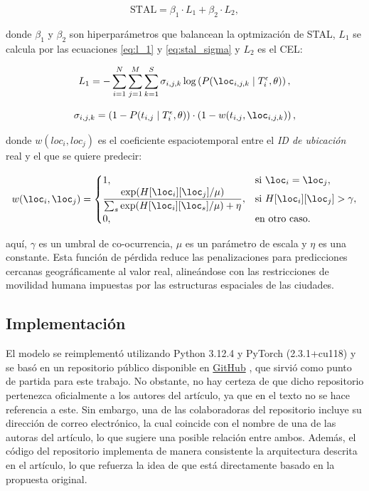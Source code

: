 \begin{equation}
\text{STAL} = \beta_1 \cdot L_1 + \beta_2 \cdot L_2,
\label{eq:stal}
\end{equation}

\noindent
donde $ \beta_1$ y $ \beta_2$ son hiperparámetros que balancean la optmización de STAL, \(L_1\) se calcula por las ecuaciones \ref{eq:l_1}  y \ref{eq:stal_sigma} y \(L_2\) es el CEL:

\begin{equation}
    L_1 = - \sum_{i=1}^N \sum_{j=1}^M \sum_{k=1}^S \sigma_{i,j,k} \log \left( P(\loc_{i,j,k} \mid T^\epsilon_i, \theta) \right),
\label{eq:l_1}
\end{equation}

\begin{equation}
    \sigma_{i,j,k} = \left( 1 - P(t_{i,j} \mid T^\epsilon_i, \theta) \right) \cdot \left( 1 - w(t_{i,j}, \loc_{i,j,k}) \right),
\label{eq:stal_sigma}
\end{equation}

\noindent
donde \(w(loc_i, loc_j)\) es el coeficiente espaciotemporal entre el \textit{ID de ubicación} real y el que se quiere predecir:

\begin{equation}
    w(\loc_i, \loc_j) =
    \begin{cases} 
        1, & \text{si } \loc_i = \loc_j, \\
        \displaystyle \frac{\exp(H[\loc_i][\loc_j] / \mu)}{\sum_s \exp(H[\loc_i][\loc_s] / \mu) + \eta}, & \text{si } H[\loc_i][\loc_j] > \gamma, \\
        0, & \text{en otro caso.}
    \end{cases}
\label{eq:w_loc_cases}
\end{equation}

\noindent
aquí, \(\gamma\) es un umbral de co-ocurrencia, \(\mu\) es un parámetro de escala y \(\eta\) es una constante. Esta función de pérdida reduce las penalizaciones para predicciones cercanas geográficamente al valor real, alineándose con las restricciones de movilidad humana impuestas por las estructuras espaciales de las ciudades.

\subsection{Implementación}

El modelo se reimplementó utilizando Python 3.12.4 y PyTorch (2.3.1+cu118) y se basó en un repositorio público disponible en \href{https://github.com/TrajResearch/TrajBERT}{GitHub} \cite{trajebert_repo}, que sirvió como punto de partida para este trabajo. No obstante, no hay certeza de que dicho repositorio pertenezca oficialmente a los autores del artículo, ya que en el texto no se hace referencia a este. Sin embargo, una de las colaboradoras del repositorio incluye su dirección de correo electrónico, la cual coincide con el nombre de una de las autoras del artículo, lo que sugiere una posible relación entre ambos. Además, el código del repositorio implementa de manera consistente la arquitectura descrita en el artículo, lo que refuerza la idea de que está directamente basado en la propuesta original.

